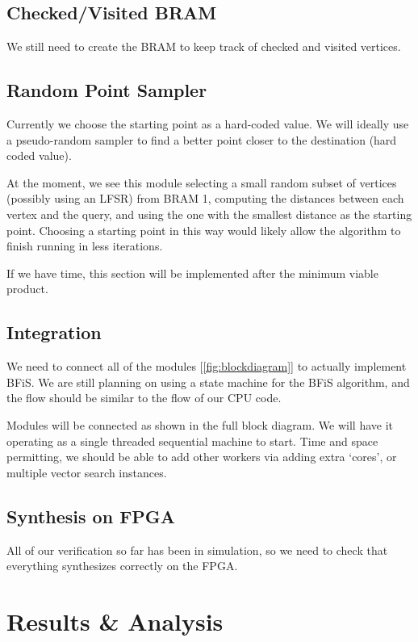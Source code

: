 \documentclass[conference]{IEEEtran}
\begin{document}
\subsection{Checked/Visited BRAM}

We still need to create the BRAM to keep track of checked and visited vertices.

\subsection{Random Point Sampler}

Currently we choose the starting point as a hard-coded value. We will ideally use a pseudo-random sampler to find a better point closer to the destination (hard coded value).

At the moment, we see this module selecting a small random subset of vertices (possibly using an LFSR) from BRAM 1, computing the distances between each vertex and the query, and using the one with the smallest distance as the starting point. Choosing a starting point in this way would likely allow the algorithm to finish running in less iterations.

If we have time, this section will be implemented after the minimum viable product.

\subsection{Integration}

We need to connect all of the modules [\ref{fig:blockdiagram}] to actually implement BFiS. We are still planning on using a state machine for the BFiS algorithm, and the flow should be similar to the flow of our CPU code.

Modules will be connected as shown in the full block diagram. We will have it operating as a single threaded sequential machine to start. Time and space permitting, we should be able to add other workers via adding extra `cores', or multiple vector search instances.

\subsection{Synthesis on FPGA}

All of our verification so far has been in simulation, so we need to check that everything synthesizes correctly on the FPGA.

\section{Results \& Analysis}
\end{document}
